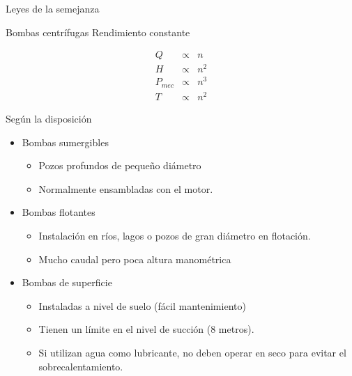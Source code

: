 \documentclass[xcolor={usenames,svgnames,dvipsnames}]{beamer}
\begin{document}
\begin{frame}[label=sec-2-2-9]{Leyes de la semejanza}
\begin{block}{Bombas centrífugas}
Rendimiento constante

$$\begin{aligned}
Q & \propto & n\\
H & \propto & n^{2}\\
P_{mec} & \propto & n^{3}\\
T & \propto & n^{2}\end{aligned}$$
\end{block}
\end{frame}

\begin{frame}[label=sec-2-2-10]{Según la disposición}
\begin{itemize}
\item \alert{Bombas sumergibles}

\begin{itemize}
\item Pozos profundos de pequeño diámetro

\item Normalmente ensambladas con el motor.
\end{itemize}

\item \alert{Bombas flotantes}

\begin{itemize}
\item Instalación en ríos, lagos o pozos de gran diámetro en flotación.

\item Mucho caudal pero poca altura manométrica
\end{itemize}

\item \alert{Bombas de superficie}

\begin{itemize}
\item Instaladas a nivel de suelo (fácil mantenimiento)

\item Tienen un límite en el nivel de succión (8 metros).

\item Si utilizan agua como lubricante, no deben operar en seco para
evitar el sobrecalentamiento.
\end{itemize}
\end{itemize}
\end{frame}
\end{document}
